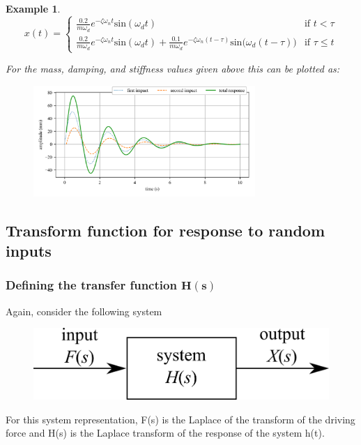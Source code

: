 \documentclass[12pt,letter]{article}
\newtheorem{ex}{Example}
\numberwithin{ex}{section} %
\newenvironment{example}{\begin{mdframed}[middlelinewidth=0.5mm]\begin{ex}\normalfont}{\end{ex}\end{mdframed}}
\numberwithin{re}{section} %
\begin{document}
\begin{example}
\[
  x(t) = 
  \begin{cases}
\frac{0.2}{m \omega_d} e^{-\zeta \omega_n t} \text{sin}(\omega_dt) & \text{if } t < \tau \\
\frac{0.2}{m \omega_d} e^{-\zeta \omega_n t} \text{sin}(\omega_dt)  + \frac{0.1}{m \omega_d} e^{-\zeta \omega_n (t-\tau)} \text{sin}\big(\omega_d(t-\tau)\big) & \text{if } \tau \leq t 
  \end{cases}
\]


For the mass, damping, and stiffness values given above this can be plotted as:
\begin{figure}[H]
	\centering
	\includegraphics[width=0.75\textwidth]{../Figures/response_double_impact.png}
\end{figure}

\end{example}


\subsection{Transform function for response to random inputs}
	
\subsubsection{Defining the transfer function $\mathbf{H(s)}$}

Again, consider the following system
\begin{figure}[H]
	\centering
	\includegraphics[]{../Figures/transfer_function_system.png}
\end{figure}
For this system representation, F(s) is the Laplace of the transform of the driving force and H(s) is the Laplace transform of the response of the system h(t). 
\end{document}
